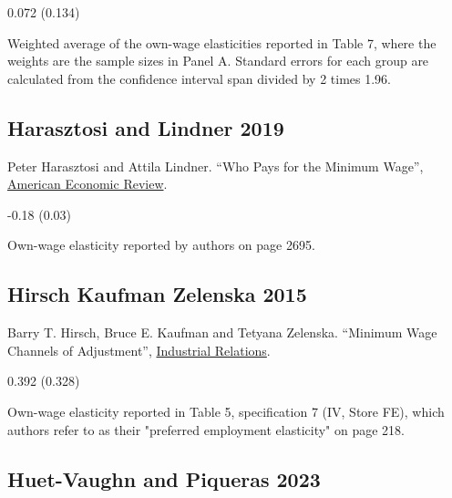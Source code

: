 \vspace{0.7em}

 0.072 (0.134)

\vspace{0.7em}

 Weighted average of the own-wage elasticities reported in Table 7, where the weights are the sample sizes in Panel A. Standard errors for each group are calculated from the confidence interval span divided by 2 times 1.96.

\subsection*{Harasztosi and Lindner 2019}
\vspace{-0.7em}

\noindent Peter Harasztosi and Attila Lindner. ``Who Pays for the Minimum Wage'', \href{https://doi.org/10.1257/aer.20171445}{American Economic Review}.

\vspace{0.7em}

 -0.18 (0.03)

\vspace{0.7em}

 Own-wage elasticity reported by authors on page 2695.

\subsection*{Hirsch Kaufman Zelenska 2015}
\vspace{-0.7em}

\noindent Barry T. Hirsch, Bruce E. Kaufman and Tetyana Zelenska. ``Minimum Wage Channels of Adjustment'', \href{https://doi.org/10.1111/irel.12091}{Industrial Relations}.

\vspace{0.7em}

 0.392 (0.328)

\vspace{0.7em}

 Own-wage elasticity reported in Table 5, specification 7 (IV, Store FE), which authors refer to as their "preferred employment elasticity" on page 218.

\subsection*{Huet-Vaughn and Piqueras 2023}
\vspace{-0.7em}

